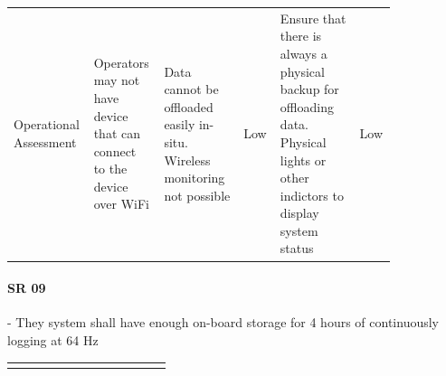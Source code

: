 \begin{landscape}
{\begin{longtable}{| p{0.12\linewidth} | p{0.16\linewidth} |  p{0.20\linewidth} | p{0.08\linewidth} | p{0.20\linewidth} | p{0.08\linewidth} |}
	\hline
	Operational \newline Assessment & Operators may not have device that can connect to the device over WiFi & Data cannot be offloaded easily in-situ. \newline Wireless monitoring not possible & \cellcolor{green} Low & Ensure that there is always a physical backup for offloading data. \newline Physical lights or other indictors to display system status & \cellcolor{green} Low
	\label{tab:sr08_feasibility}
\end{longtable}
}
\newpage




\paragraph*{SR 09} - They system shall have enough on-board storage for 4 hours of continuously logging at 64 Hz

{\fontsize{8pt}{8pt}\selectfont
\begin{longtable}{| p{0.12\linewidth} | p{0.16\linewidth} |  p{0.20\linewidth} | p{0.08\linewidth} | p{0.20\linewidth} | p{0.08\linewidth} |}
	\hline \endlastfoot
	

\end{longtable}}
\end{landscape}
